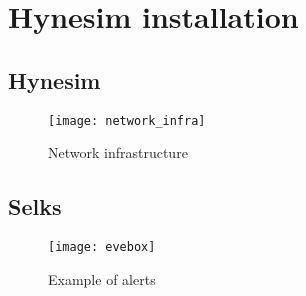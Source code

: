 
\chapter{Hynesim installation}

\section{Hynesim}


\begin{figure}[h]
  \centering
  \texttt{[image: network\_infra]}
  \caption{Network infrastructure}
  \label{fig:infra}
\end{figure}

\section{Selks}

\begin{figure}[h]
  \centering
  \texttt{[image: evebox]}
  \caption{Example of alerts}
  \label{fig:evebox}
\end{figure}


